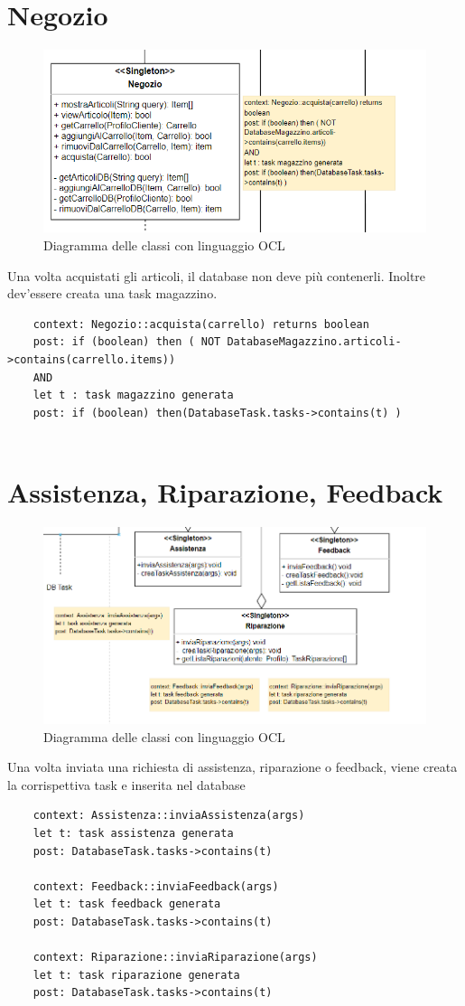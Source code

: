 \documentclass{report}
\begin{document}
\section{Negozio}
\begin{figure}[H]
	\centering\includegraphics[width=1\textwidth]{images/OCL/OCL_negozio.png}
	Diagramma delle classi con linguaggio OCL 
\end{figure}
Una volta acquistati gli articoli, il database non deve più contenerli. Inoltre dev'essere creata una task magazzino.
\begin{verbatim}
	context: Negozio::acquista(carrello) returns boolean
	post: if (boolean) then ( NOT DatabaseMagazzino.articoli->contains(carrello.items))
	AND
	let t : task magazzino generata 
	post: if (boolean) then(DatabaseTask.tasks->contains(t) )
	
\end{verbatim}
\section{Assistenza, Riparazione, Feedback}
\begin{figure}[H]
	\centering\includegraphics[width=1\textwidth]{images/OCL/OCL_assistenza_riparazione_feedback.PNG}
	Diagramma delle classi con linguaggio OCL 
\end{figure}
Una volta inviata una richiesta di assistenza, riparazione o feedback, viene creata la corrispettiva task e inserita nel database
\begin{verbatim}
	context: Assistenza::inviaAssistenza(args)
	let t: task assistenza generata
	post: DatabaseTask.tasks->contains(t)

	context: Feedback::inviaFeedback(args)
	let t: task feedback generata
	post: DatabaseTask.tasks->contains(t)

	context: Riparazione::inviaRiparazione(args)
	let t: task riparazione generata
	post: DatabaseTask.tasks->contains(t)

\end{verbatim}
\end{document}
